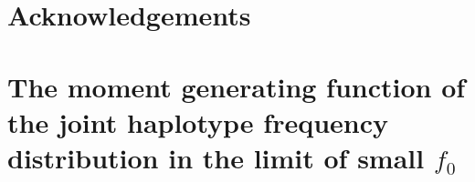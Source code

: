 \documentclass[aps,rmp,twocolumn,groupedaddress,floatfix,notitlepage]{revtex4-1}
\begin{document}
\section*{Acknowledgements}

\clearpage
\pagestyle{plain}
\printbibliography

\clearpage
\newpage
\onecolumngrid
\appendix

\section{The moment generating function of the joint haplotype frequency distribution in the limit of small $f_0$} \label{appendix:H}

\setcounter{equation}{0}
\end{document}
